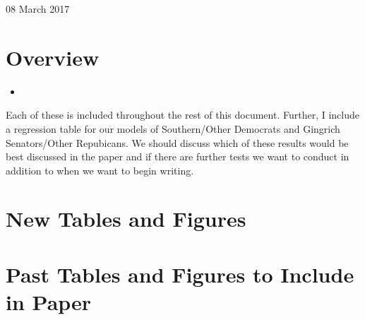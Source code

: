 \documentclass[12pt]{article}
\begin{document}
	
\begin{center}
	\Large 08 March 2017
\end{center}

\section{Overview}

\begin{itemize}
	\item 
\end{itemize}

\noindent
Each of these is included throughout the rest of this document. Further, I include a regression table for our models of Southern/Other Democrats and Gingrich Senators/Other Repubicans. We should discuss which of these results would be best discussed in the paper and if there are further tests we want to conduct in addition to when we want to begin writing.

\clearpage	

\section{New Tables and Figures}
	
\section{Past Tables and Figures to Include in Paper}
\end{document}
